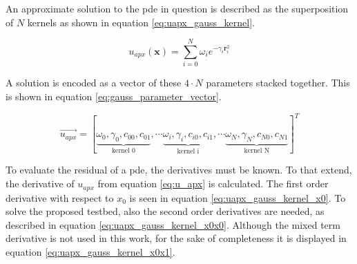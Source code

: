\documentclass[./\jobname.tex]{subfiles}
\begin{document}
\begin{figure}[H]
	\centering
	\noindent{}
	\label{fig:gauss_kernel_3d_plot}
\end{figure}

An approximate solution to the \gls{pde} in question is described as the superposition of $N$ kernels as shown in equation \ref{eq:uapx_gauss_kernel}. 

\begin{equation}
\label{eq:uapx_gauss_kernel}
u_{apx}(\mathbf{x}) = \sum_{i=0}^{N} \omega_i e^{-\gamma_i \mathbf{r}_i^2}
\end{equation}

A solution is encoded as a vector of these $4\cdot N$ parameters stacked together. This is shown in equation \ref{eq:gauss_parameter_vector}. 

\begin{equation}
\label{eq:gauss_parameter_vector}
\vec{u_{apx}} = \left[\underbrace{\omega_0, \gamma_0, c_{00}, c_{01}}_{\text{kernel 0}}, \cdots \underbrace{\omega_i, \gamma_i, c_{i0}, c_{i1}}_{\text{kernel i}}, \cdots \underbrace{\omega_N, \gamma_N, c_{N0}, c_{N1}}_{\text{kernel N}} \right]^T
\end{equation}

To evaluate the residual of a \gls{pde}, the derivatives must be known. To that extend, the derivative of $u_{apx}$ from equation \ref{eq:u_apx} is calculated. The first order derivative with respect to $x_0$ is seen in equation \ref{eq:uapx_gauss_kernel_x0}. To solve the proposed testbed, also the second order derivatives are needed, as described in equation \ref{eq:uapx_gauss_kernel_x0x0}. Although the mixed term derivative is not used in this work, for the sake of completeness it is displayed in equation \ref{eq:uapx_gauss_kernel_x0x1}.  
\end{document}
